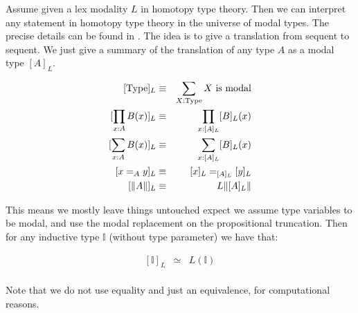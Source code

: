 Assume given a lex modality $L$ in homotopy type theory. Then we can interpret any statement in homotopy type theory in the universe of modal types. The precise details can be found in . The idea is to give a translation from sequent to sequent. We just give a summary of the translation of any type $A$ as a modal type $[A]_L$.

\begin{eqnarray}
{[\mathrm{Type}]_L} &\equiv& \sum_{X:\mathrm{Type}} X\ \mathrm{is\ modal}\\
{[\prod_{x:A}B(x)]_L} &\equiv& \prod_{x:[A]_L}[B]_L(x)\\
{[\sum_{x:A}B(x)]_L} &\equiv& \sum_{x:[A]_L}[B]_L(x)\\
{[x=_Ay]_L} &\equiv& [x]_L=_{[A]_L}[y]_L\\
{[\propTrunc{A}]_L} &\equiv& L\propTrunc{[A]_L}
\end{eqnarray}

This means we mostly leave things untouched expect we assume type variables to be modal, and use the modal replacement on the propositional truncation. Then for any inductive type $\mathbb{I}$ (without type parameter) we have that:

\begin{eqnarray}
{[\mathbb{I}]_L} &\simeq& L(\mathbb{I})\\
\end{eqnarray}

Note that we do not use equality and just an equivalence, for computational reasons.

